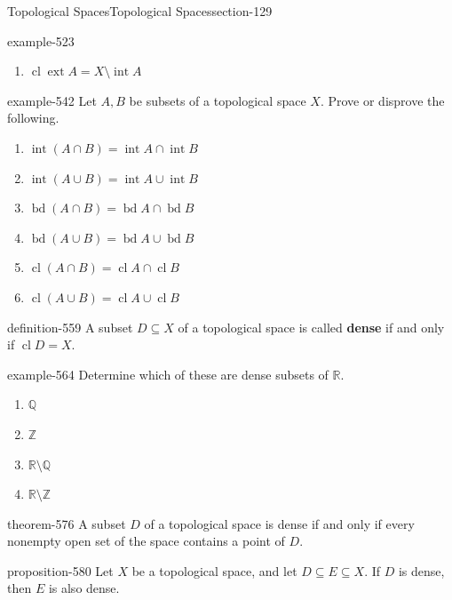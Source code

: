 \documentclass[oneside,10pt,]{article}
\newcommand{\terminology}[1]{\textbf{#1}}
\newcommand{\mb}{\mathbb}
\newcommand{\cl}{\operatorname{cl}}
\renewcommand{\int}{\operatorname{int}}
\newcommand{\ext}{\operatorname{ext}}
\newcommand{\bd}{\operatorname{bd}}
\begin{document}
\begin{sectionptx}{Topological Spaces}{}{Topological Spaces}{}{}{section-129}
\begin{example}{}{example-523}
\begin{enumerate}
\item\hypertarget{li-540}{}\(\cl\ext A=X\setminus\int A\)%
\end{enumerate}
\end{example}
\begin{example}{}{example-542}%
\hypertarget{p-543}{}%
Let \(A,B\) be subsets of a topological space \(X\). Prove or disprove the following.%
\leavevmode%
\begin{enumerate}
\item\hypertarget{li-547}{}\(\int(A\cap B)=\int A\cap\int B\)%
\item\hypertarget{li-549}{}\(\int(A\cup B)=\int A\cup\int B\)%
\item\hypertarget{li-551}{}\(\bd(A\cap B)=\bd A\cap\bd B\)%
\item\hypertarget{li-553}{}\(\bd(A\cup B)=\bd A\cup\bd B\)%
\item\hypertarget{li-555}{}\(\cl(A\cap B)=\cl A\cap\cl B\)%
\item\hypertarget{li-557}{}\(\cl(A\cup B)=\cl A\cup\cl B\)%
\end{enumerate}
\end{example}
\begin{definition}{}{definition-559}%
\hypertarget{p-560}{}%
A subset \(D\subseteq X\) of a topological space is called \terminology{dense} if and only if \(\cl D=X\).%
\end{definition}
\begin{example}{}{example-564}%
\hypertarget{p-565}{}%
Determine which of these are dense subsets of \(\mb R\).%
\leavevmode%
\begin{enumerate}
\item\hypertarget{li-568}{}\(\mb Q\)%
\item\hypertarget{li-570}{}\(\mb Z\)%
\item\hypertarget{li-572}{}\(\mb R\setminus\mb Q\)%
\item\hypertarget{li-574}{}\(\mb R\setminus\mb Z\)%
\end{enumerate}
\end{example}
\begin{theorem}{}{}{theorem-576}%
\hypertarget{p-577}{}%
A subset \(D\) of a topological space is dense if and only if every nonempty open set of the space contains a point of \(D\).%
\end{theorem}
\begin{proposition}{}{}{proposition-580}%
\hypertarget{p-581}{}%
Let \(X\) be a topological space, and let \(D\subseteq E\subseteq X\). If \(D\) is dense, then \(E\) is also dense.%

\end{proposition}
\end{sectionptx}
\end{document}

